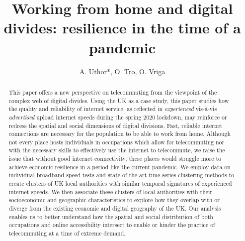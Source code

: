 \documentclass[Royal,times,sageh]{sagej}
\begin{document}
\title{Working from home and digital divides: resilience in the time of a
pandemic}

\runninghead{}

\author{A. Uthor*, O. Tro, O. Vriga}




\begin{abstract}
This paper offers a new perspective on telecommuting from the viewpoint
of the complex web of digital divides. Using the UK as a case study,
this paper studies how the quality and reliability of internet service,
as reflected in \emph{experienced} vis-à-vis \emph{advertised} upload
internet speeds during the spring 2020 lockdown, may reinforce or
redress the spatial and social dimensions of digital divisions. Fast,
reliable internet connections are necessary for the population to be
able to work from home. Although not every place hosts individuals in
occupations which allow for telecommuting nor with the necessary skills
to effectively use the internet to telecommute, we raise the issue that
without good internet connectivity, these places would struggle more to
achieve economic resilience in a period like the current pandemic. We
employ data on individual broadband speed tests and state-of-the-art
time-series clustering methods to create clusters of UK local
authorities with similar temporal signatures of experienced internet
speeds. We then associate these clusters of local authorities with their
socioeconomic and geographic characteristics to explore how they overlap
with or diverge from the existing economic and digital geography of the
UK. Our analysis enables us to better understand how the spatial and
social distribution of both occupations and online accessibility
intersect to enable or hinder the practice of telecommuting at a time of
extreme demand.
\end{abstract}

\end{document}
